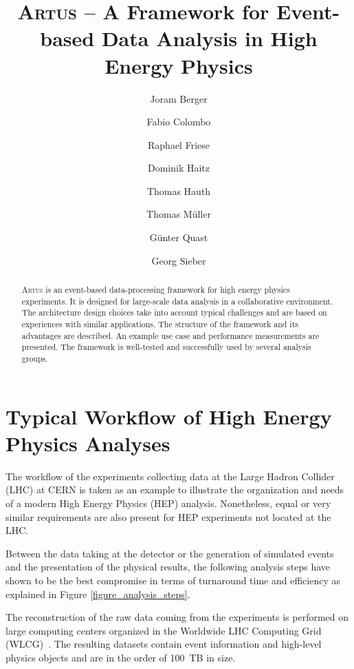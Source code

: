 \documentclass[3p]{elsarticle}
\newcommand{\software}[1]{\textsc{#1}\xspace}
\newcommand{\artus}{\software{Artus}}
\begin{document}
\begin{frontmatter}
\title{\artus{} -- A Framework for Event-based Data Analysis in High Energy Physics}

\author{Joram Berger}
\author{Fabio Colombo}
\author{Raphael Friese}
\author{Dominik Haitz}
\author{Thomas Hauth}
\author{Thomas M\"uller}
\author{G\"unter Quast}
\author{Georg Sieber}
\address{Karlsruhe Institute of Technology, Wolfgang-Gaede-Stra\ss{}e 1, D-76131 Karlsruhe}

\begin{abstract}
\artus is an event-based data-processing framework for high energy physics experiments.
It is designed for large-scale data analysis in a collaborative environment.
The architecture design choices take into account typical challenges and are based on experiences with similar applications.
The structure of the framework and its advantages are described.
An example use case and performance measurements are presented.
The framework is well-tested and successfully used by several analysis groups.
\end{abstract}

\end{frontmatter}



\section{Typical Workflow of High Energy Physics Analyses}
\label{section_artus_analysis_workflow}
The workflow of the experiments collecting data at the Large Hadron Collider (LHC) at CERN is taken as an example to illustrate the organization and needs of a modern High Energy Physics (HEP) analysis.
Nonetheless, equal or very similar requirements are also present for HEP experiments not located at the LHC.

Between the data taking at the detector or the generation of simulated events and the presentation of the physical results, the following analysis steps have shown to be the best compromise in terms of turnaround time and efficiency as explained in Figure \ref{figure_analysis_steps}.

The reconstruction of the raw data coming from the experiments is performed on large computing centers organized in the Worldwide LHC Computing Grid (WLCG)~\cite{wlcg}.
The resulting datasets contain event information and high-level physics objects and are in the order of \SI{100}{TB} in size.
\end{document}
